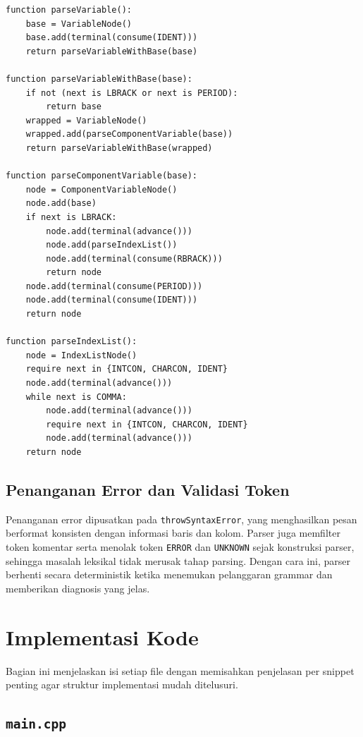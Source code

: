 \begin{tcolorbox}[title=Pseudocode variable berantai,colback=gray!5,colframe=black!60,boxrule=0.5pt,arc=2mm,breakable]
\begin{verbatim}
function parseVariable():
    base = VariableNode()
    base.add(terminal(consume(IDENT)))
    return parseVariableWithBase(base)

function parseVariableWithBase(base):
    if not (next is LBRACK or next is PERIOD):
        return base
    wrapped = VariableNode()
    wrapped.add(parseComponentVariable(base))
    return parseVariableWithBase(wrapped)

function parseComponentVariable(base):
    node = ComponentVariableNode()
    node.add(base)
    if next is LBRACK:
        node.add(terminal(advance()))
        node.add(parseIndexList())
        node.add(terminal(consume(RBRACK)))
        return node
    node.add(terminal(consume(PERIOD)))
    node.add(terminal(consume(IDENT)))
    return node

function parseIndexList():
    node = IndexListNode()
    require next in {INTCON, CHARCON, IDENT}
    node.add(terminal(advance()))
    while next is COMMA:
        node.add(terminal(advance()))
        require next in {INTCON, CHARCON, IDENT}
        node.add(terminal(advance()))
    return node
\end{verbatim}
\end{tcolorbox}

\subsection{Penanganan Error dan Validasi Token}
Penanganan error dipusatkan pada \texttt{throwSyntaxError}, yang menghasilkan pesan berformat konsisten dengan informasi baris dan kolom. Parser juga memfilter token komentar serta menolak token \texttt{ERROR} dan \texttt{UNKNOWN} sejak konstruksi parser, sehingga masalah leksikal tidak merusak tahap parsing. Dengan cara ini, parser berhenti secara deterministik ketika menemukan pelanggaran grammar dan memberikan diagnosis yang jelas.

\section{Implementasi Kode}
Bagian ini menjelaskan isi setiap file dengan memisahkan penjelasan per snippet penting agar struktur implementasi mudah ditelusuri.

\subsection{\texttt{main.cpp}}
